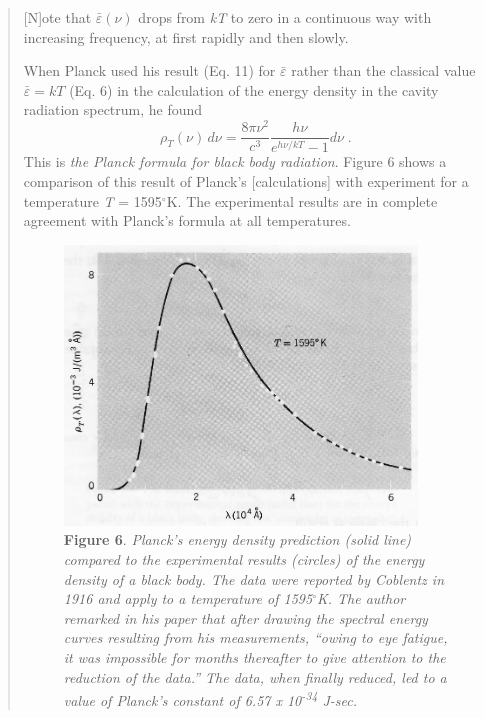 \begin{quotation}
{[}N{]}ote that $\bar{\varepsilon}(\nu)$ drops from \emph{kT} to zero in a continuous
way with increasing frequency, at first rapidly and then slowly.

When Planck used his result (Eq. 11) for $\bar{\varepsilon}$ rather than the classical value
$\bar{\varepsilon} = kT$ (Eq. 6) in the calculation of the energy density in the
cavity radiation spectrum, he found
\begin{equation}
\rho_T(\nu)\, d\nu = \frac{8\pi\nu^2}{c^3} \frac{h\nu}{e^{h\nu/kT}-1} d\nu \; . %
\end{equation}
This is \emph{the Planck formula for black body radiation}. Figure 6
shows a comparison of this result of Planck's {[}calculations{]} with
experiment for a temperature \emph{T} = 1595$^\circ$K. The experimental results
are in complete agreement with Planck's formula at all temperatures.

%
\begin{figure}[h]
  \begin{center}
  \captionsetup{width=4.6875in}
  \includegraphics[width=3.6875in,height=2.92708in]{images/05_planck/image037.jpg}
  \caption*{\textbf{Figure 6}. \emph{Planck's energy density prediction (solid line)
    compared to the experimental results (circles) of the energy density of
    a black body. The data were reported by Coblentz in 1916 and apply to a
    temperature of 1595$^\circ$K. The author remarked in his paper that after
    drawing the spectral energy curves resulting from his measurements,
    ``owing to eye fatigue, it was impossible for months thereafter to give
    attention to the reduction of the data.'' The data, when finally
    reduced, led to a value of Planck's constant of 6.57 x
    10\textsuperscript{-34} J-sec.}}
  \end{center}
\end{figure}
\end{quotation}

